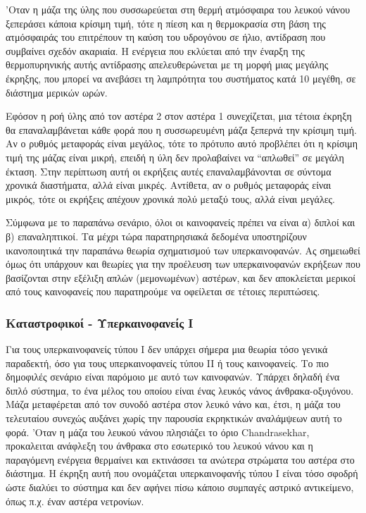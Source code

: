 'Οταν η μάζα της ύλης που συσσωρεύεται στη θερμή ατμόσφαιρα του λευκού νάνου ξεπεράσει κάποια κρίσιμη τιμή, τότε η πίεση και η θερμοκρασία στη βάση της ατμόσφαιράς του επιτρέπουν τη καύση του υδρογόνου σε ήλιο, αντίδραση που συμβαίνει σχεδόν ακαριαία. Η ενέργεια που εκλύεται από την έναρξη της θερμοπυρηνικής αυτής αντίδρασης απελευθερώνεται με τη μορφή μιας μεγάλης έκρηξης, που μπορεί να ανεβάσει τη λαμπρότητα του συστήματος κατά 10 μεγέθη, σε διάστημα μερικών ωρών.

Εφόσον η ροή ύλης από τον αστέρα 2 στον αστέρα 1 συνεχίζεται, μια τέτοια έκρηξη θα επαναλαμβάνεται κάθε φορά που η συσσωρευμένη μάζα ξεπερνά την κρίσιμη τιμή. Αν ο ρυθμός μεταφοράς είναι μεγάλος, τότε το πρότυπο αυτό προβλέπει ότι η κρίσιμη τιμή της μάζας είναι μικρή, επειδή η ύλη δεν προλαβαίνει να ``απλωθεί'' σε μεγάλη έκταση. Στην περίπτωση αυτή οι εκρήξεις αυτές επαναλαμβάνονται σε σύντομα χρονικά διαστήματα, αλλά είναι μικρές. Αντίθετα, αν ο ρυθμός μεταφοράς είναι μικρός, τότε οι εκρήξεις απέχουν χρονικά πολύ μεταξύ τους, αλλά είναι μεγάλες.

Σύμφωνα με το παραπάνω σενάριο, όλοι οι καινοφανείς πρέπει να είναι α) διπλοί και β) επαναληπτικοί. Τα μέχρι τώρα παρατηρησιακά δεδομένα υποστηρίζουν ικανοποιητικά την παραπάνω θεωρία σχηματισμού των υπερκαινοφανών. Ας σημειωθεί όμως ότι υπάρχουν και θεωρίες για την προέλευση των υπερκαινοφανών εκρήξεων που βασίζονται στην εξέλιξη απλών (μεμονωμένων) αστέρων, και δεν αποκλείεται μερικοί από τους καινοφανείς που παρατηρούμε να οφείλεται σε τέτοιες περιπτώσεις.

\subsubsection{Καταστροφικοί - Υπερκαινοφανείς I}
Για τους υπερκαινοφανείς τύπου I δεν υπάρχει σήμερα μια θεωρία τόσο γενικά παραδεκτή, όσο για τους υπερκαινοφανείς τύπου II ή τους καινοφανείς. Το πιο δημοφιλές σενάριο είναι παρόμοιο με αυτό των καινοφανών. Υπάρχει δηλαδή ένα διπλό σύστημα, το ένα μέλος του οποίου είναι ένας λευκός νάνος άνθρακα-οξυγόνου. Μάζα μεταφέρεται από τον συνοδό αστέρα στον λευκό νάνο και, έτσι, η μάζα του τελευταίου συνεχώς αυξάνει χωρίς την παρουσία εκρηκτικών αναλάμψεων αυτή το φορά. 'Οταν η μάζα του λευκού νάνου πλησιάζει το όριο Chandrasekhar, προκαλειται ανάφλεξη του άνθρακα στο εσωτερικό του λευκού νάνου και η παραγόμενη ενέργεια  θερμαίνει και εκτινάσσει τα ανώτερα στρώματα του αστέρα στο διάστημα. Η έκρηξη αυτή που ονομάζεται υπερκαινοφανής τύπου I είναι τόσο σφοδρή ώστε διαλύει το σύστημα και δεν αφήνει πίσω κάποιο συμπαγές αστρικό αντικείμενο, όπως π.χ. έναν αστέρα νετρονίων.

